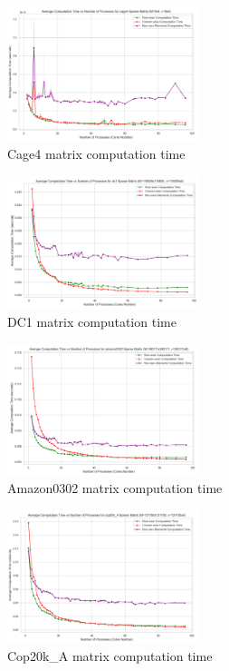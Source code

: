 \documentclass[12pt,oneside]{book} %
\begin{document}
\begin{figure}[H]
    \centering
    \includegraphics[width=0.5\textwidth]{../results/matrix_dim/cage4_k6_computation_time.png}
    \caption{Cage4 matrix computation time}\label{fig:cage4-k6-computation-time}
\end{figure}

\begin{figure}[H]
    \centering
    \includegraphics[width=0.5\textwidth]{../results/matrix_dim/dc1_k6_computation_time.png}
    \caption{DC1 matrix computation time}\label{fig:dc1-k6-computation-time}
\end{figure}

\begin{figure}[H]
    \centering
    \includegraphics[width=0.5\textwidth]{../results/matrix_dim/amazon0302_k6_computation_time.png}
    \caption{Amazon0302 matrix computation time}\label{fig:amazon0302-k6-computation-time}
\end{figure}

\begin{figure}[H]
    \centering
    \includegraphics[width=0.5\textwidth]{../results/matrix_dim/cop20k_A_k6_computation_time.png}
    \caption{Cop20k\_A matrix computation time}\label{fig:cop20k-a-k6-computation-tim-1}
\end{figure}
\end{document}
